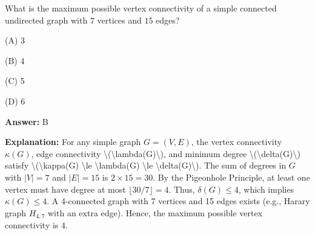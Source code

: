 \begin{tcolorbox}[enhanced,breakable,colback=boxgray,colframe=gray!45,boxrule=0.4pt,arc=2pt,left=6pt,right=6pt,top=4pt,bottom=4pt,title={Q.12},fonttitle=\bfseries\small,coltitle=black,colbacktitle=gray!15]
\small What is the maximum possible vertex connectivity of a simple connected undirected graph with $7$ vertices and $15$ edges?\par\par\hspace*{1em}(A) 3\par\hspace*{1em}(B) 4\par\hspace*{1em}(C) 5\par\hspace*{1em}(D) 6\par{}\par\smallskip\textbf{Answer:} B\par\par\textbf{Explanation:} For any simple graph $G = (V, E)$, the vertex connectivity $\kappa(G)$, edge connectivity \textbackslash{}(\textbackslash{}lambda(G)\textbackslash{}), and minimum degree \textbackslash{}(\textbackslash{}delta(G)\textbackslash{}) satisfy \textbackslash{}(\textbackslash{}kappa(G) \textbackslash{}le \textbackslash{}lambda(G) \textbackslash{}le \textbackslash{}delta(G)\textbackslash{}). The sum of degrees in $G$ with $|V| = 7$ and $|E| = 15$ is $2 \times 15 = 30$. By the Pigeonhole Principle, at least one vertex must have degree at most $\lfloor 30 / 7 \rfloor = 4$. Thus, $\delta(G) \le 4$, which implies $\kappa(G) \le 4$. A 4-connected graph with 7 vertices and 15 edges exists (e.g., Harary graph $H_{4,7}$ with an extra edge). Hence, the maximum possible vertex connectivity is 4.\par
\end{tcolorbox}


